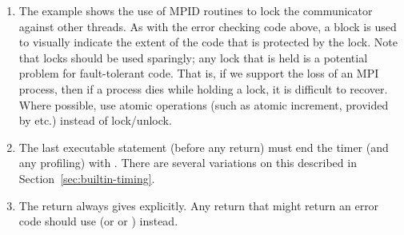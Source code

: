 \documentclass{article}
\begin{document}
\begin{enumerate}
\item The example shows the use of MPID routines to lock the communicator
  against other threads.  As with the error checking code above, a
block is used to visually indicate the extent of the code that is
protected by the lock.  Note that locks should be used sparingly; any
lock that is held is a potential problem for fault-tolerant code.
That is, if we support the loss of an MPI process, then if a process
dies while holding a lock, it is difficult to recover.  Where
possible, use atomic operations (such as atomic increment, provided by
 etc.) instead of lock/unlock.  
%
%
\item The last executable statement (before any return) must end the
timer (and any profiling) with .  There are
several variations on this described in Section~\ref{sec:builtin-timing}.
\item The return always gives  explicitly.  Any return that
  might return an error code should use  (or
   or ) instead. 
\end{enumerate}
\end{document}
